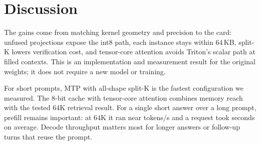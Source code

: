 \documentclass[11pt,letterpaper]{article}
\begin{document}
\section{Discussion}
\label{sec:discussion}
The gains come from matching kernel geometry and precision to the card:
unfused projections expose the int8 path, each instance stays within
64\,KB, split-K lowers verification cost, and tensor-core attention avoids
Triton's scalar path at filled contexts. This is an implementation and
measurement result for the original weights; it does not require a new
model or training.

For short prompts, MTP with all-shape split-K is the fastest configuration
we measured. The 8-bit cache with tensor-core attention combines
\PeReachEE{} memory reach with the tested 64K retrieval result.
For a single short answer over a long prompt, prefill remains important:
at 64K it ran near \PeArmEESixtyFourPrefill{} tokens/s and a request took
\PeArmEESixtyFourItemS{} seconds on average. Decode throughput matters most
for longer answers or follow-up turns that reuse the prompt.
\end{document}
